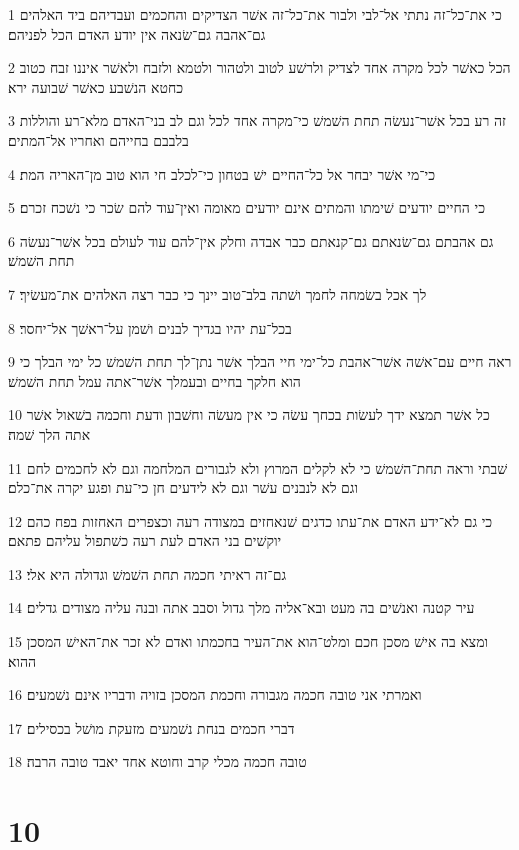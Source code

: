 \par 1 כי את־כל־זה נתתי אל־לבי ולבור את־כל־זה אשׁר הצדיקים והחכמים ועבדיהם ביד האלהים גם־אהבה גם־שׂנאה אין יודע האדם הכל לפניהם׃
\par 2 הכל כאשׁר לכל מקרה אחד לצדיק ולרשׁע לטוב ולטהור ולטמא ולזבח ולאשׁר איננו זבח כטוב כחטא הנשׁבע כאשׁר שׁבועה ירא׃
\par 3 זה רע בכל אשׁר־נעשׂה תחת השׁמשׁ כי־מקרה אחד לכל וגם לב בני־האדם מלא־רע והוללות בלבבם בחייהם ואחריו אל־המתים׃
\par 4 כי־מי אשׁר יבחר אל כל־החיים ישׁ בטחון כי־לכלב חי הוא טוב מן־האריה המת׃
\par 5 כי החיים יודעים שׁימתו והמתים אינם יודעים מאומה ואין־עוד להם שׂכר כי נשׁכח זכרם׃
\par 6 גם אהבתם גם־שׂנאתם גם־קנאתם כבר אבדה וחלק אין־להם עוד לעולם בכל אשׁר־נעשׂה תחת השׁמשׁ׃
\par 7 לך אכל בשׂמחה לחמך ושׁתה בלב־טוב יינך כי כבר רצה האלהים את־מעשׂיך׃
\par 8 בכל־עת יהיו בגדיך לבנים ושׁמן על־ראשׁך אל־יחסר׃
\par 9 ראה חיים עם־אשׁה אשׁר־אהבת כל־ימי חיי הבלך אשׁר נתן־לך תחת השׁמשׁ כל ימי הבלך כי הוא חלקך בחיים ובעמלך אשׁר־אתה עמל תחת השׁמשׁ׃
\par 10 כל אשׁר תמצא ידך לעשׂות בכחך עשׂה כי אין מעשׂה וחשׁבון ודעת וחכמה בשׁאול אשׁר אתה הלך שׁמה׃
\par 11 שׁבתי וראה תחת־השׁמשׁ כי לא לקלים המרוץ ולא לגבורים המלחמה וגם לא לחכמים לחם וגם לא לנבנים עשׁר וגם לא לידעים חן כי־עת ופגע יקרה את־כלם׃
\par 12 כי גם לא־ידע האדם את־עתו כדגים שׁנאחזים במצודה רעה וכצפרים האחזות בפח כהם יוקשׁים בני האדם לעת רעה כשׁתפול עליהם פתאם׃
\par 13 גם־זה ראיתי חכמה תחת השׁמשׁ וגדולה היא אלי׃
\par 14 עיר קטנה ואנשׁים בה מעט ובא־אליה מלך גדול וסבב אתה ובנה עליה מצודים גדלים׃
\par 15 ומצא בה אישׁ מסכן חכם ומלט־הוא את־העיר בחכמתו ואדם לא זכר את־האישׁ המסכן ההוא׃
\par 16 ואמרתי אני טובה חכמה מגבורה וחכמת המסכן בזויה ודבריו אינם נשׁמעים׃
\par 17 דברי חכמים בנחת נשׁמעים מזעקת מושׁל בכסילים׃
\par 18 טובה חכמה מכלי קרב וחוטא אחד יאבד טובה הרבה׃

\chapter{10}

